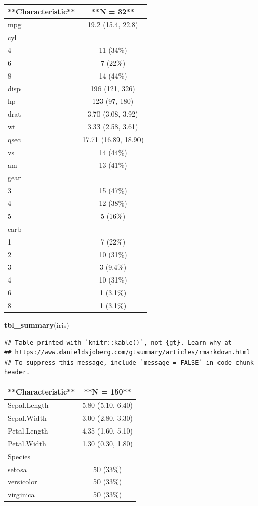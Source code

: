 \documentclass[
]{book}
\newenvironment{Shaded}{\begin{snugshade}}{\end{snugshade}}
\newcommand{\FunctionTok}[1]{\textcolor[rgb]{0.13,0.29,0.53}{\textbf{#1}}}
\newcommand{\NormalTok}[1]{#1}
\begin{document}
\begin{tabular}{l|c}
\hline
**Characteristic** & **N = 32**\\
\hline
mpg & 19.2 (15.4, 22.8)\\
\hline
cyl & \\
\hline
4 & 11 (34\%)\\
\hline
6 & 7 (22\%)\\
\hline
8 & 14 (44\%)\\
\hline
disp & 196 (121, 326)\\
\hline
hp & 123 (97, 180)\\
\hline
drat & 3.70 (3.08, 3.92)\\
\hline
wt & 3.33 (2.58, 3.61)\\
\hline
qsec & 17.71 (16.89, 18.90)\\
\hline
vs & 14 (44\%)\\
\hline
am & 13 (41\%)\\
\hline
gear & \\
\hline
3 & 15 (47\%)\\
\hline
4 & 12 (38\%)\\
\hline
5 & 5 (16\%)\\
\hline
carb & \\
\hline
1 & 7 (22\%)\\
\hline
2 & 10 (31\%)\\
\hline
3 & 3 (9.4\%)\\
\hline
4 & 10 (31\%)\\
\hline
6 & 1 (3.1\%)\\
\hline
8 & 1 (3.1\%)\\
\hline
\end{tabular}

\begin{Shaded}
\begin{Highlighting}[]
\FunctionTok{tbl\_summary}\NormalTok{(iris)}
\end{Highlighting}
\end{Shaded}

\begin{verbatim}
## Table printed with `knitr::kable()`, not {gt}. Learn why at
## https://www.danieldsjoberg.com/gtsummary/articles/rmarkdown.html
## To suppress this message, include `message = FALSE` in code chunk header.
\end{verbatim}

\begin{tabular}{l|c}
\hline
**Characteristic** & **N = 150**\\
\hline
Sepal.Length & 5.80 (5.10, 6.40)\\
\hline
Sepal.Width & 3.00 (2.80, 3.30)\\
\hline
Petal.Length & 4.35 (1.60, 5.10)\\
\hline
Petal.Width & 1.30 (0.30, 1.80)\\
\hline
Species & \\
\hline
setosa & 50 (33\%)\\
\hline
versicolor & 50 (33\%)\\
\hline
virginica & 50 (33\%)\\
\hline
\end{tabular}
\end{document}
